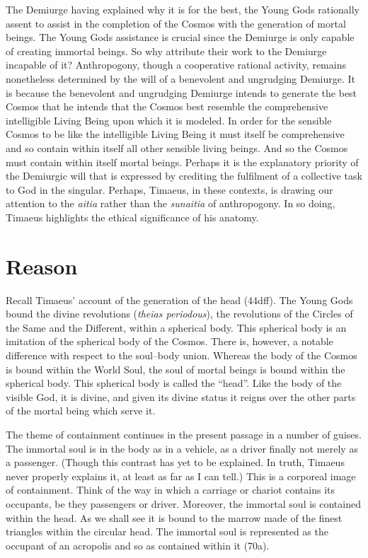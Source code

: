 The Demiurge having explained why it is for the best, the Young Gods rationally assent to assist in the completion of the Cosmos with the generation of mortal beings. The Young Gods assistance is crucial since the Demiurge is only capable of creating immortal beings. So why attribute their work to the Demiurge incapable of it? Anthropogony, though a cooperative rational activity, remains nonetheless determined by the will of a benevolent and ungrudging Demiurge. It is because the benevolent and ungrudging Demiurge intends to generate the best Cosmos that he intends that the Cosmos best resemble the comprehensive intelligible Living Being upon which it is modeled. In order for the sensible Cosmos to be like the intelligible Living Being it must itself be comprehensive and so contain within itself all other sensible living beings. And so the Cosmos must contain within itself mortal beings. Perhaps it is the explanatory priority of the Demiurgic will that is expressed by crediting the fulfilment of a collective task to God in the singular. Perhaps, Timaeus, in these contexts, is drawing our attention to the \emph{aitia} rather than the \emph{sunaitia} of anthropogony. In so doing, Timaeus highlights the ethical significance of his anatomy.



\section{Reason} %
\label{sec:reason}

Recall Timaeus' account of the generation of the head (44dff). The Young Gods bound the divine revolutions (\emph{theias periodous}), the revolutions of the Circles of the Same and the Different, within a spherical body. This spherical body is an imitation of the spherical body of the Cosmos. There is, however, a notable difference with respect to the soul–body union. Whereas the body of the Cosmos is bound within the World Soul, the soul of mortal beings is bound within the spherical body. This spherical body is called the “head”. Like the body of the visible God, it is divine, and given its divine status it reigns over the other parts of the mortal being which serve it.

The theme of containment continues in the present passage in a number of guises. The immortal soul is in the body as in a vehicle, as a driver finally not merely as a passenger. (Though this contrast has yet to be explained. In truth, Timaeus never properly explains it, at least as far as I can tell.) This is a corporeal image of containment. Think of the way in which a carriage or chariot contains its occupants, be they passengers or driver. Moreover, the immortal soul is contained within the head. As we shall see it is bound to the marrow made of the finest triangles within the circular head. The immortal soul is represented as the occupant of an acropolis and so as contained within it (70a). 

